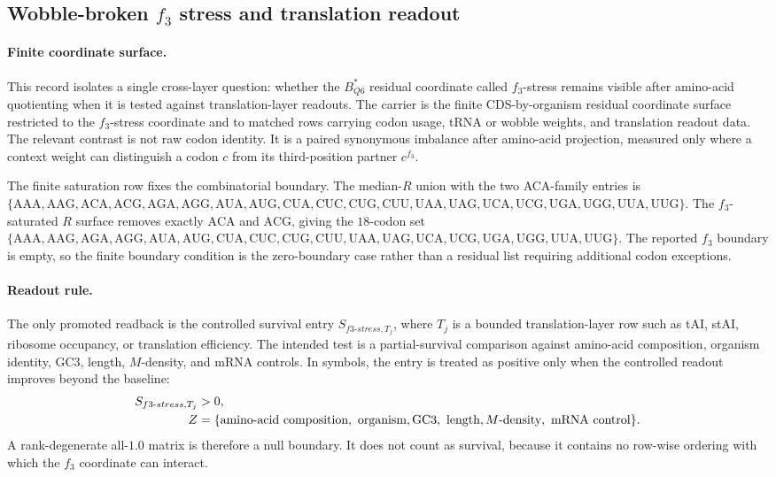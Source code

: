 \subsection{Wobble-broken $f_3$ stress and translation readout}
\label{sec:q6-f3-stress-wobble-broken-translation-readout-cross-layer}

\paragraph{Finite coordinate surface.}
This record isolates a single cross-layer question: whether the $B^{*}_{Q6}$ residual coordinate called $f_3$-stress remains visible after amino-acid quotienting when it is tested against translation-layer readouts. The carrier is the finite CDS-by-organism residual coordinate surface restricted to the $f_3$-stress coordinate and to matched rows carrying codon usage, tRNA or wobble weights, and translation readout data. The relevant contrast is not raw codon identity. It is a paired synonymous imbalance after amino-acid projection, measured only where a context weight can distinguish a codon $c$ from its third-position partner $c^{f_3}$.

The finite saturation row fixes the combinatorial boundary. The median-$R$ union with the two ACA-family entries is
$\{\mathrm{AAA},\mathrm{AAG},\mathrm{ACA},\mathrm{ACG},\mathrm{AGA},\mathrm{AGG},\mathrm{AUA},\mathrm{AUG},\mathrm{CUA},\mathrm{CUC},\mathrm{CUG},\mathrm{CUU},\mathrm{UAA},\mathrm{UAG},\mathrm{UCA},\mathrm{UCG},\mathrm{UGA},\mathrm{UGG},\mathrm{UUA},\mathrm{UUG}\}$.
The $f_3$-saturated $R$ surface removes exactly $\mathrm{ACA}$ and $\mathrm{ACG}$, giving the $18$-codon set
$\{\mathrm{AAA},\mathrm{AAG},\mathrm{AGA},\mathrm{AGG},\mathrm{AUA},\mathrm{AUG},\mathrm{CUA},\mathrm{CUC},\mathrm{CUG},\mathrm{CUU},\mathrm{UAA},\mathrm{UAG},\mathrm{UCA},\mathrm{UCG},\mathrm{UGA},\mathrm{UGG},\mathrm{UUA},\mathrm{UUG}\}$.
The reported $f_3$ boundary is empty, so the finite boundary condition is the zero-boundary case rather than a residual list requiring additional codon exceptions.

\paragraph{Readout rule.}
The only promoted readback is the controlled survival entry $S_{f3\text{-}stress,T_j}$, where $T_j$ is a bounded translation-layer row such as tAI, stAI, ribosome occupancy, or translation efficiency. The intended test is a partial-survival comparison against amino-acid composition, organism identity, GC3, length, $M$-density, and mRNA controls. In symbols, the entry is treated as positive only when the controlled readout improves beyond the baseline:
$$
\begin{aligned}
S_{f3\text{-}stress,T_j} &> 0,\\
Z &= \{\hbox{amino-acid composition},\hbox{ organism},\mathrm{GC3},\hbox{ length},M\hbox{-density},\hbox{ mRNA control}\}.
\end{aligned}
$$
A rank-degenerate all-$1.0$ matrix is therefore a null boundary. It does not count as survival, because it contains no row-wise ordering with which the $f_3$ coordinate can interact.

